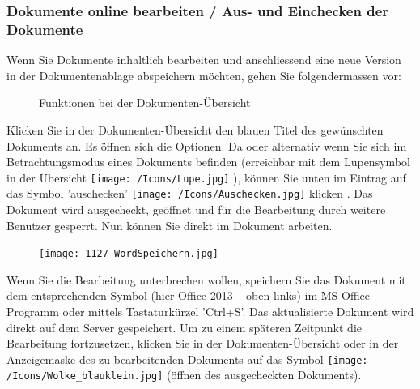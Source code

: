 \subsubsection{Dokumente online bearbeiten / Aus- und Einchecken der Dokumente}
\label{bkm:Ref442780171}\label{bkm:Ref442776572}

Wenn Sie Dokumente inhaltlich bearbeiten und anschliessend eine neue Version in der Dokumentenablage abspeichern möchten, gehen Sie folgendermassen vor:

\begin{figure}[H]
\caption{Funktionen bei der Dokumenten-Übersicht}
\end{figure}

Klicken Sie in der Dokumenten-Übersicht den blauen Titel des gewünschten Dokuments  an. Es öffnen sich die Optionen. Da oder alternativ wenn Sie sich im Betrachtungsmodus eines Dokuments befinden (erreichbar mit dem Lupensymbol in der Übersicht \texttt{[image: /Icons/Lupe.jpg]} ), können Sie unten im Eintrag auf das Symbol 'auschecken' \texttt{[image: /Icons/Auschecken.jpg]} klicken . Das Dokument wird ausgecheckt, geöffnet und für die Bearbeitung durch weitere Benutzer gesperrt. Nun können Sie direkt im Dokument arbeiten. 

\begin{figure}
\vspace{-15pt}
\texttt{[image: 1127\_WordSpeichern.jpg]}
\end{figure}
Wenn Sie die Bearbeitung unterbrechen wollen, speichern Sie das Dokument mit dem entsprechenden Symbol  (hier Office 2013 -- oben links) im MS Office-Programm oder mittels Tastaturkürzel 'Ctrl+S'. Das aktualisierte Dokument wird direkt auf dem Server gespeichert. Um zu einem späteren Zeitpunkt die Bearbeitung fortzusetzen, klicken Sie in der Dokumenten-Übersicht oder in der Anzeigemaske des zu bearbeitenden Dokuments auf das Symbol \texttt{[image: /Icons/Wolke\_blauklein.jpg]}  (öffnen des ausgecheckten Dokuments).

